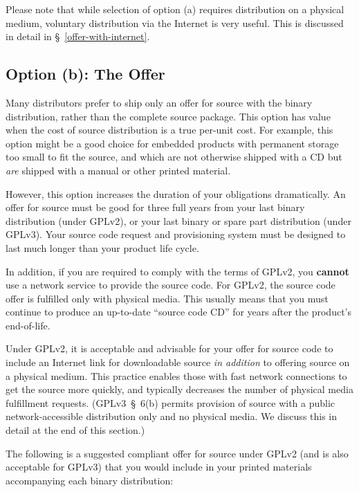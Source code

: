 Please note that while selection of option (a) requires distribution on a
physical medium, voluntary distribution via the Internet is very useful.  This
is discussed in detail in \S~\ref{offer-with-internet}.

\subsection{Option (b): The Offer}
\label{offer-for-source}

Many distributors prefer to ship only an offer for source with the binary
distribution, rather than the complete source package.  This
option has value when the cost of source distribution is a true
per-unit cost.  For example, this option might be a good choice for
embedded products with permanent storage too small to fit the source, and
which are not otherwise shipped with a CD but \emph{are} shipped with a
manual or other printed material.

However, this option increases the duration of your obligations
dramatically.  An offer for source must be good for three full years from
your last binary distribution (under GPLv2), or your last binary or spare
part distribution (under GPLv3).  Your source code request and
provisioning system must be designed to last much longer than your product
life cycle.

In addition, if you are required to comply with the terms of GPLv2, you
{\bf cannot} use a network service to provide the source code.  For GPLv2,
the source code offer is fulfilled only with physical media.  This usually
means that you must continue to produce an up-to-date ``source code CD''
for years after the product's end-of-life.

\label{offer-with-internet}

Under GPLv2, it is acceptable and advisable for your offer for source code
to include an Internet link for downloadable source \emph{in addition} to
offering source on a physical medium.  This practice enables those with
fast network connections to get the source more quickly, and typically
decreases the number of physical media fulfillment requests.
(GPLv3~\S~6(b) permits provision of source with a public
network-accessible distribution only and no physical media.  We discuss
this in detail at the end of this section.)

The following is a suggested compliant offer for source under GPLv2 (and
is also acceptable for GPLv3) that you would include in your printed
materials accompanying each binary distribution:

